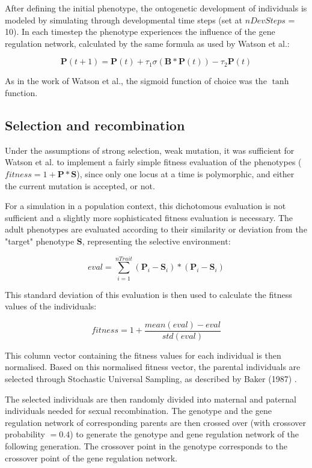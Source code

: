 \documentclass{article}
\begin{document}
After defining the initial phenotype, the ontogenetic development of individuals is modeled by simulating through developmental time steps (set at $nDevSteps$ = 10). In each timestep the phenotype experiences the influence of the gene regulation network, calculated by the same formula as used by Watson et al.: 

\begin{equation}
	\bm{P}(t+1) = \bm{P}(t) + \tau_1\sigma(\bm{B}*\bm{P}(t))-\tau_2\bm{P}(t)
\end{equation}

As in the work of Watson et al., the sigmoid function of choice was the $\tanh$ function.

\subsection{Selection and recombination}

Under the assumptions of strong selection, weak mutation, it was sufficient for Watson et al. to implement a fairly simple fitness evaluation of the phenotypes ($fitness = 1 + \bm{P}*\bm{S}$), since only one locus at a time is polymorphic, and either the current mutation is accepted, or not.

For a simulation in a population context, this dichotomous evaluation is not sufficient and a slightly more sophisticated fitness evaluation is necessary. The adult phenotypes are evaluated according to their similarity or deviation from the "target" phenotype $\bm{S}$, representing the selective environment:

\begin{equation}
	eval = \sum_{i=1}^{nTrait} (\bm{P}_i - \bm{S}_i) * (\bm{P}_i - \bm{S}_i)
\end{equation}

This standard deviation of this evaluation is then used to calculate the fitness values of the individuals:

\begin{equation}
	fitness = 1 + \frac{mean(eval) - eval}{std(eval)}
\end{equation}

This column vector containing the fitness values for each individual is then normalised. Based on this normalised fitness vector, the parental individuals are selected through Stochastic Universal Sampling, as described by Baker (1987) \cite{baker1987}.

The selected individuals are then randomly divided into maternal and paternal individuals needed for sexual recombination. The genotype and the gene regulation network of corresponding parents are then crossed over (with crossover probability $= 0.4$) to generate the genotype and gene regulation network of the following generation. The crossover point in the genotype corresponds to the crossover point of the gene regulation network.
\end{document}
